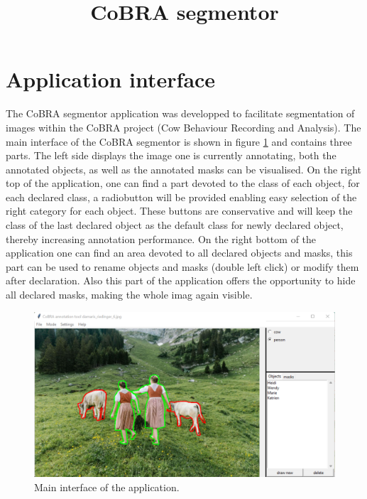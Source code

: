 \documentclass[a4paper, 11pt]{article}
\title{\bf{CoBRA segmentor}}
\author{}
\date{}
\begin{document}
	
\maketitle
\vspace{-7em}

\section{Application interface}
The CoBRA segmentor application was developped to facilitate segmentation of images within the CoBRA project (Cow Behaviour Recording and Analysis). The main interface of the CoBRA segmentor is shown in figure \ref{fig:application_main_view} and contains three parts. The left side displays the image one is currently annotating, both the annotated objects, as well as the annotated masks can be visualised. On the right top of the application, one can find a part devoted to the class of each object, for each declared class, a radiobutton will be provided enabling easy selection of the right category for each object. These buttons are conservative and will keep the class of the last declared object as the default class for newly declared object, thereby increasing annotation performance. On the right bottom of the application one can find an area devoted to all declared objects and masks, this part can be used to rename objects and masks (double left click) or modify them after declaration. Also this part of the application offers the opportunity to hide all declared masks, making the whole imag again visible.

\begin{figure}[h]
	\centering
	\includegraphics[width=\textwidth]{application_main_view}
	\captionsetup{width=0.8\textwidth}
	\caption{Main interface of the application.}
	\label{fig:application_main_view}
\end{figure}
\end{document}
